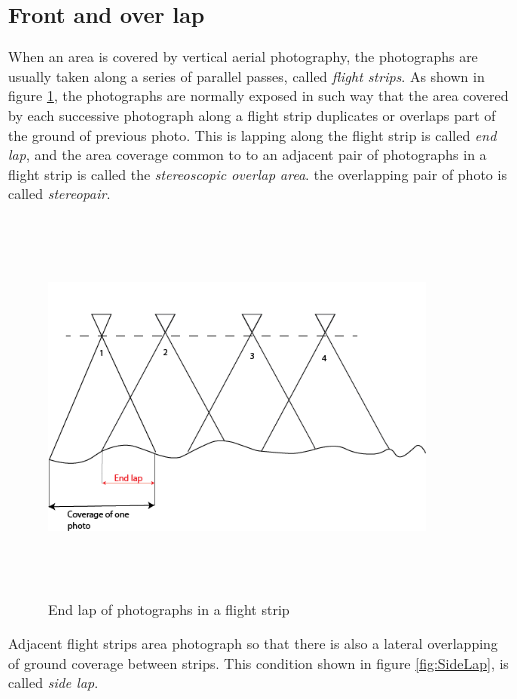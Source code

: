 \subsection{Front and over lap}
When an area is covered by vertical aerial photography, the photographs are usually taken along a series of parallel passes, called \textit{flight strips}. As shown in figure \ref{fig:EndLap}, the photographs are normally exposed in such way that the area covered by each successive photograph along a flight strip duplicates or overlaps part of the ground of previous photo. This is lapping along the flight strip is called \textit{end lap}, and the area coverage common to to an adjacent pair of photographs in a flight strip is called the \textit{stereoscopic overlap area}. the overlapping pair of photo is called \textit{stereopair}\cite{elements_photogrammetry}.
\begin{figure}[H]
\centering
\includegraphics[width=10cm,height=10cm,keepaspectratio]{imagenes/End_Lap.png}
\caption{End lap of photographs in a flight strip}
\label{fig:EndLap}
\end{figure}
Adjacent flight strips area photograph so that there is also a lateral overlapping of ground coverage between strips. This condition shown in figure \ref{fig:SideLap}, is called \textit{side lap}\cite{elements_photogrammetry}.
